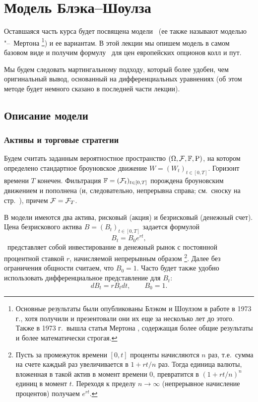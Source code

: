 \chapter{Модель Блэка--Шоулза}
\label{ch:bs}
\chaptertoc

Оставшаяся часть курса будет посвящена модели \bs\ (ее также называют моделью \bs"--~Мертона%
\footnote{Основные результаты были опубликованы Блэком и Шоулзом в работе \cite{BlackScholes73} в 1973 г., хотя получили и презентовали они их еще за несколько лет до этого.
Также в 1973 г.\ вышла статья Мертона \cite{Merton73}, содержащая более общие результаты и более математически строгая.})
и ее вариантам.
В этой лекции мы опишем модель в самом базовом виде и получим формулу \bs\ для цен европейских опционов колл и пут.

Мы будем следовать мартингальному подходу, который более удобен, чем оригинальный вывод, основанный на дифференциальных уравнениях (об этом методе будет немного сказано в последней части лекции).


\section{Описание модели}

\subsection{Активы и торговые стратегии}

Будем считать заданным вероятностное пространство $(\Omega, \mathcal{F}, \mathbb{F}, \mathrm{P})$, на котором определено стандартное броуновское движение $W=(W_t)_{t\in[0,T]}$.
Горизонт времени $T$ конечен.
Фильтрация $\mathbb{F}=(\mathcal{F}_t)_{t\in[0,T]}$ порождена броуновским движением и пополнена (и, следовательно, непрерывна справа; см.\ сноску на стр.~\pageref{8:f:brownian-filtration}), причем $\mathcal{F}=\mathcal{F}_T$.

В модели имеются два актива, рисковый (акция) и безрисковый (денежный счет).
Цена безрискового актива $B=(B_t)_{t\in[0,T]}$ задается формулой
\[
B_t = B_0 e^{rt},
\]
\te\ представляет собой инвестирование в денежный рынок с постоянной процентной ставкой $r$, начисляемой непрерывным образом%
\footnote{Пусть за промежуток времени $[0,t]$ проценты начисляются $n$ раз, т.е.\ сумма на счете каждый раз увеличивается в $1+rt/n$ раз.
Тогда единица валюты, вложенная в такой актив в момент времени $0$, превратится в $(1+rt/n)^n$ единиц в момент $t$.
Переходя к пределу $n\to\infty$ (непрерывное начисление процентов) получаем $e^{rt}$.}.
Далее без ограничения общности считаем, что $B_0=1$.
Часто будет также удобно использовать дифференциальное представление для $B_t$:
\[
d B_t = r B_t dt, \qquad B_0=1.
\]


